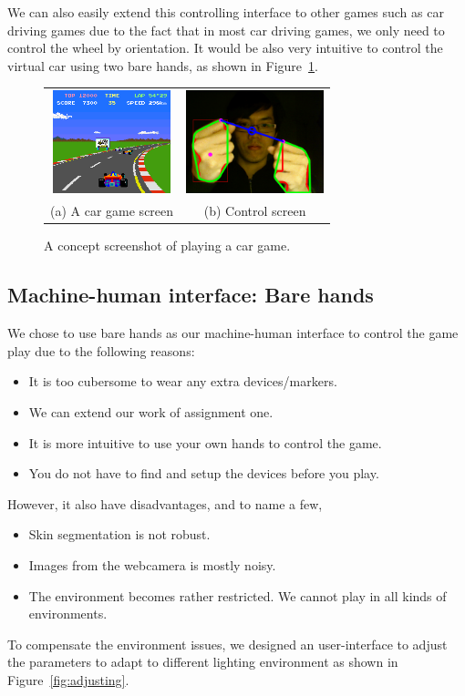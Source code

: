 \documentclass[10pt,twocolumn,letterpaper]{article}
\begin{document}
We can also easily extend this controlling interface to other 
games such as car driving games due to the fact that in most 
car driving games, we only need to control the wheel by 
orientation. It would be also very intuitive to control 
the virtual car using two bare hands, as shown in Figure~\ref{fig:cargame}.
\begin{figure}[h]
\centering
\begin{tabular}{cc}
\includegraphics[height=3cm]{cargame.png} &
\includegraphics[height=3cm]{gesture0047.png} \\
(a) A car game screen &
(b) Control screen
\end{tabular}
\caption{A concept screenshot of playing a car game.}
\label{fig:cargame}
\end{figure}

\subsection{Machine-human interface: Bare hands}
\label{sec:whybarehands}
We chose to use bare hands as our machine-human interface 
to control the game play due to the following reasons:

\begin{itemize}
	\item It is too cubersome to wear any extra devices/markers.
	\item We can extend our work of assignment one.
	\item It is more intuitive to use your own hands to control the game.
	\item You do not have to find and setup the devices before you play.
\end{itemize}

However, it also have disadvantages, and to name a few,
\begin{itemize}
	\item Skin segmentation is not robust.
	\item Images from the webcamera is mostly noisy.
	\item The environment becomes rather restricted. We cannot play in all kinds of environments.
\end{itemize}
To compensate the environment issues, we designed an user-interface 
to adjust the parameters to adapt to different lighting environment as shown in Figure~\ref{fig:adjusting}. 
\end{document}
